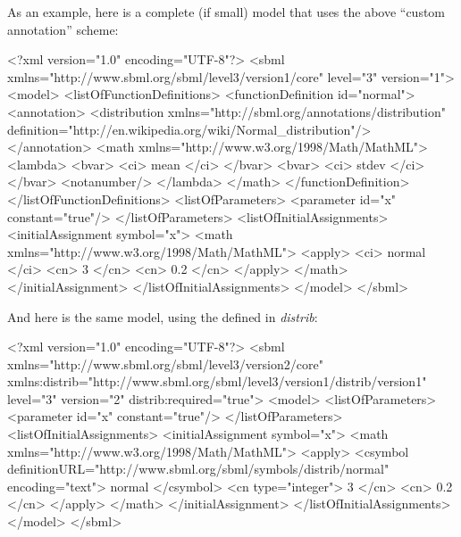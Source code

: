 \documentclass[draftspec]{sbmlpkgspec}
\newcommand{\distribshort}{\emph{distrib}\xspace}
\begin{document}

As an example, here is a complete (if small) model that uses the above ``custom annotation'' scheme:

\begin{example}
<?xml version="1.0" encoding="UTF-8"?>
<sbml xmlns="http://www.sbml.org/sbml/level3/version1/core"
      level="3" version="1">
  <model>
    <listOfFunctionDefinitions>
      <functionDefinition id="normal">
        <annotation>
          <distribution xmlns="http://sbml.org/annotations/distribution"
                   definition="http://en.wikipedia.org/wiki/Normal_distribution"/>
        </annotation>
        <math xmlns="http://www.w3.org/1998/Math/MathML">
          <lambda>
            <bvar>
              <ci> mean </ci>
            </bvar>
            <bvar>
              <ci> stdev </ci>
            </bvar>
            <notanumber/>
          </lambda>
        </math>
      </functionDefinition>
    </listOfFunctionDefinitions>
    <listOfParameters>
      <parameter id="x" constant="true"/>
    </listOfParameters>
    <listOfInitialAssignments>
      <initialAssignment symbol="x">
        <math xmlns="http://www.w3.org/1998/Math/MathML">
          <apply>
            <ci> normal </ci>
            <cn> 3 </cn>
            <cn> 0.2 </cn>
          </apply>
        </math>
      </initialAssignment>
    </listOfInitialAssignments>
  </model>
</sbml>

\end{example}

And here is the same model, using the  defined in \distribshort:

\begin{example}
<?xml version="1.0" encoding="UTF-8"?>
<sbml xmlns="http://www.sbml.org/sbml/level3/version2/core"
      xmlns:distrib="http://www.sbml.org/sbml/level3/version1/distrib/version1"
      level="3" version="2" distrib:required="true">
  <model>
    <listOfParameters>
      <parameter id="x" constant="true"/>
    </listOfParameters>
    <listOfInitialAssignments>
      <initialAssignment symbol="x">
        <math xmlns="http://www.w3.org/1998/Math/MathML">
          <apply>
              <csymbol definitionURL="http://www.sbml.org/sbml/symbols/distrib/normal"
                       encoding="text"> normal </csymbol>
            <cn type="integer"> 3 </cn>
            <cn> 0.2 </cn>
          </apply>
        </math>
      </initialAssignment>
    </listOfInitialAssignments>
  </model>
</sbml>
\end{example}
\end{document}

